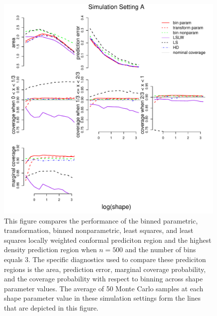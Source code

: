 \documentclass[11pt]{article}\usepackage[]{graphicx}\usepackage[]{color}
\makeatletter
\def\maxwidth{ %
  \ifdim\Gin@nat@width>\linewidth
    \linewidth
  \else
    \Gin@nat@width
  \fi
}
\newenvironment{knitrout}{}{} %
\makeatother
\begin{document}
\newpage
\begin{figure}[h!]
\begin{center}
\begin{knitrout}
\color{fgcolor}
\includegraphics[width=\maxwidth]{figure/Fig-gamma-500-1} 

\end{knitrout}
\end{center}
\caption{This figure compares the performance of the 
  binned parametric,
  transformation,
  binned nonparametric,
  least squares, and 
  least squares locally weighted conformal prediciton region and the 
  highest density prediction region when $n = 500$ and the number of bins 
  equals 3.  
  The specific diagnostics used to compare these prediciton regions is the 
    area,
    prediction error, 
    marginal coverage probability,
    and the coverage probability with respect to binning 
    across shape parameter values.
  The average of 50 Monte Carlo samples at each shape parameter value in 
  these simulation settings form the lines that are depicted in this figure.}
\label{Fig:gamma.500}
\end{figure}
\end{document}
